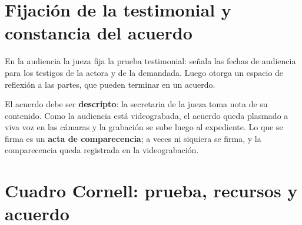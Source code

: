 \documentclass[12pt,oneside]{book}
\begin{document}
\section{Fijación de la testimonial y constancia del acuerdo}

En la audiencia la jueza fija la prueba testimonial: señala las fechas de audiencia para los testigos de la actora y de la demandada. Luego otorga un espacio de reflexión a las partes, que pueden terminar en un acuerdo.

El acuerdo debe ser \textbf{descripto}: la secretaria de la jueza toma nota de su contenido. Como la audiencia está videograbada, el acuerdo queda plasmado a viva voz en las cámaras y la grabación se sube luego al expediente. Lo que se firma es un \textbf{acta de comparecencia}; a veces ni siquiera se firma, y la comparecencia queda registrada en la videograbación.

\section{Cuadro Cornell: prueba, recursos y acuerdo}
\end{document}
